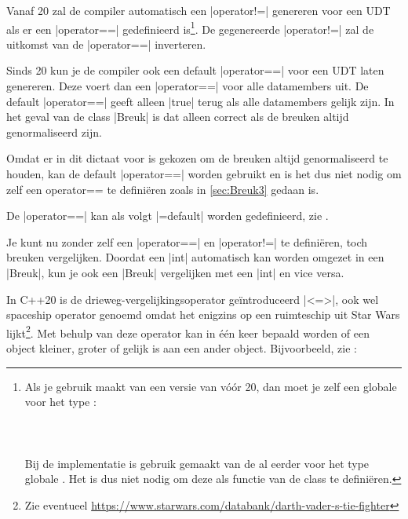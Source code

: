 \begin{cpplstShortInline}
Vanaf \Cpp{}20 zal de compiler automatisch een |operator!=| genereren voor een UDT als er een |operator==| gedefinieerd is\footnote{%
	Als je gebruik maakt van een \Cpp{} versie van vóór \Cpp{}20, dan moet je zelf een globale   voor het type :\\
	\\
	\\
	\ccode{\}}\\
	Bij de implementatie is gebruik gemaakt van de al eerder voor het type   globale . 
	Het is dus niet nodig om deze  als  functie van de class  te definiëren.
}.
De gegenereerde |operator!=| zal de uitkomst van de |operator==| inverteren.

Sinds \Cpp{}20 kun je de compiler ook een default |operator==| voor een UDT laten genereren.
Deze voert dan een |operator==| voor alle datamembers uit.
De default |operator==| geeft alleen |true| terug als alle datamembers gelijk zijn.
In het geval van de class |Breuk| is dat alleen correct als de breuken altijd genormaliseerd zijn.

Omdat er in dit dictaat voor is gekozen om de breuken altijd genormaliseerd te houden, kan de default |operator==| worden gebruikt en is het dus niet nodig om zelf een operator== te definiëren zoals in \cref{sec:Breuk3} gedaan is.

De |operator==| kan als volgt |=default| worden gedefinieerd, zie .

Je kunt nu zonder zelf een |operator==| en |operator!=| te definiëren, toch breuken vergelijken.
Doordat een |int| automatisch kan worden omgezet in een |Breuk|, kun je ook een |Breuk| vergelijken met een |int| en vice versa.

\label{sec:spaceship}
In C++20 is de drieweg-vergelijkingsoperator geïntroduceerd |<=>|, ook wel spaceship operator genoemd omdat het enigzins op een ruimteschip uit Star Wars lijkt\footnote{%
	Zie eventueel \url{https://www.starwars.com/databank/darth-vader-s-tie-fighter}
}.
Met behulp van deze operator kan in één keer bepaald worden of een object kleiner, groter of gelijk is aan een ander object.
Bijvoorbeeld, zie :


\end{cpplstShortInline}
